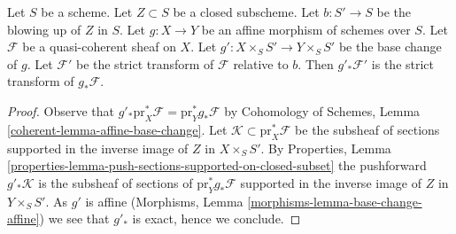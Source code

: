 \begin{lemma}
\label{lemma-strict-transform-affine}
Let $S$ be a scheme. Let $Z \subset S$ be a closed subscheme.
Let $b : S' \to S$ be the blowing up of $Z$ in $S$. Let
$g : X \to Y$ be an affine morphism of schemes over $S$.
Let $\mathcal{F}$ be a quasi-coherent sheaf on $X$.
Let $g' : X \times_S S' \to Y \times_S S'$ be the base change
of $g$. Let $\mathcal{F}'$ be the strict transform of $\mathcal{F}$
relative to $b$. Then $g'_*\mathcal{F}'$ is the strict transform
of $g_*\mathcal{F}$.
\end{lemma}

\begin{proof}
Observe that $g'_*\text{pr}_X^*\mathcal{F} = \text{pr}_Y^*g_*\mathcal{F}$
by Cohomology of Schemes, Lemma \ref{coherent-lemma-affine-base-change}.
Let $\mathcal{K} \subset \text{pr}_X^*\mathcal{F}$ be the subsheaf
of sections supported in the inverse image of $Z$ in $X \times_S S'$.
By Properties, Lemma
\ref{properties-lemma-push-sections-supported-on-closed-subset}
the pushforward $g'_*\mathcal{K}$ is the subsheaf of sections of
$\text{pr}_Y^*g_*\mathcal{F}$ supported in the inverse
image of $Z$ in $Y \times_S S'$. As $g'$ is affine
(Morphisms, Lemma \ref{morphisms-lemma-base-change-affine})
we see that $g'_*$ is exact, hence we conclude.
\end{proof}
